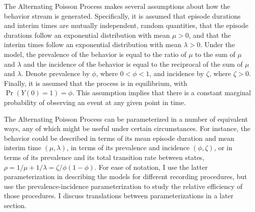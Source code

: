 \documentclass[man, noextraspace, floatsintext]{apa6}\usepackage[]{graphicx}\usepackage[]{color}
\begin{document}
The Alternating Poisson Process makes several assumptions about how the behavior stream is generated. 
Specifically, it is assumed that episode durations and interim times are mutually independent, random quantities, that the episode durations follow an exponential distribution with mean $\mu > 0$, and that the interim times follow an exponential distribution with mean $\lambda > 0$. 
Under the model, the prevalence of the behavior is equal to the ratio of $\mu$ to the sum of $\mu$ and $\lambda$ and the incidence of the behavior is equal to the reciprocal of the sum of $\mu$ and $\lambda$. 
Denote prevalence by $\phi$, where $0 < \phi < 1$, and incidence by $\zeta$, where $\zeta > 0$. Finally, it is assumed that the process is in equilibrium, with $\Pr\left(Y(0) = 1\right) = \phi$. 
This assumption implies that there is a constant marginal probability of observing an event at any given point in time.

The Alternating Poisson Process can be parameterized in a number of equivalent ways, any of which might be useful under certain circumstances. For instance, the behavior could be described in terms of its mean episode duration and mean interim time $(\mu, \lambda)$, in terms of its prevalence and incidence $(\phi, \zeta)$, or in terms of its prevalence and its total transition rate between states, $\rho = 1 / \mu + 1 / \lambda = \zeta / \phi(1 - \phi)$. For ease of notation, I use the latter parameterization in describing the models for different recording procedures, but use the prevalence-incidence parameterization to study the relative efficiency of those procedures. I discuss translations between parameterizations in a later section.
\end{document}
